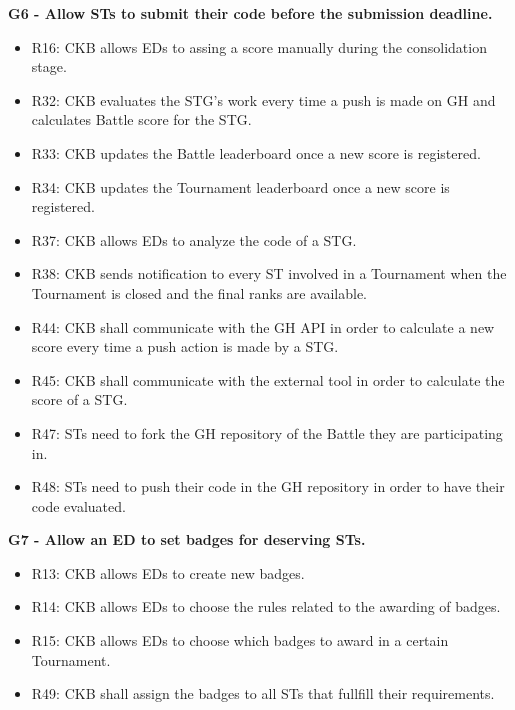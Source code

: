 \vspace{1.5cm}
\textbf{G6 - Allow STs to submit their code before the submission deadline.}\\
\begin{itemize}
    \item R16: CKB allows EDs to assing a score manually during the consolidation stage.
    \item R32: CKB evaluates the STG's work every time a push is made on GH and calculates Battle score for the STG.
    \item R33: CKB updates the Battle leaderboard once a new score is registered.
    \item R34: CKB updates the Tournament leaderboard once a new score is registered.
    \item R37: CKB allows EDs to analyze the code of a STG.
    \item R38: CKB sends notification to every ST involved in a Tournament when the Tournament is closed and the final ranks are available.
    \item R44: CKB shall communicate with the GH API in order to calculate a new score every time a push action is made by a STG.
    \item R45: CKB shall communicate with the external tool in order to calculate the score of a STG.
    \item R47: STs need to fork the GH repository of the Battle they are participating in.
    \item R48: STs need to push their code in the GH repository in order to have their code evaluated.
\end{itemize}


\vspace{1.5cm}
\textbf{G7 - Allow an ED to set badges for deserving STs.}\\
\begin{itemize}
    \item R13: CKB allows EDs to create new badges.
    \item R14: CKB allows EDs to choose the rules related to the awarding of badges.
    \item R15: CKB allows EDs to choose which badges to award in a certain Tournament.
    \item R49: CKB shall assign the badges to all STs that fullfill their requirements.
\end{itemize}


